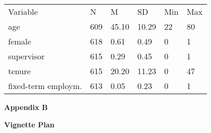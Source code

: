 \documentclass{article}
\begin{document}
\begin{table}

  
\begin{tabular}{l  l  l  l  l  l}

  Variable & N & M & SD & Min & Max\\
age & 609 & 45.10 & 10.29 & 22 & 80\\
female & 618 & 0.61 & 0.49 & 0 & 1\\
supervisor & 615 & 0.29 & 0.45 & 0 & 1\\
tenure & 615 & 20.20 & 11.23 & 0 & 47\\
fixed-term employm. & 613 & 0.05 & 0.23 & 0 & 1\\


\end{tabular}


\end{table}
\textbf{}

\textbf{}

\textbf{Appendix B}

\textbf{Vignette Plan}
\end{document}

